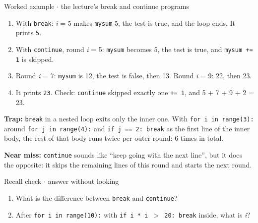 \documentclass[11pt]{article}
\begin{document}
\begin{keepsection}
\begin{workedbox}{Worked example \ensuremath{\cdot} the lecture’s break and continue programs}
\begin{enumerate}
\item With \texttt{break}: \textit{i} = 5 makes \texttt{mysum} 5, the test is true, and the loop ends. It prints \texttt{5}.
\item With \texttt{continue}, round \textit{i} = 5: \texttt{mysum} becomes 5, the test is true, and \texttt{mysum += 1} is skipped.
\item Round \textit{i} = 7: \texttt{mysum} is 12, the test is false, then 13. Round \textit{i} = 9: 22, then 23.
\item It prints \texttt{23}. Check: \texttt{continue} skipped exactly one \texttt{+= 1}, and 5 + 7 + 9 + 2 = 23.
\end{enumerate}
\end{workedbox}

\begin{notebox}\textbf{Trap:} \texttt{break} in a nested loop exits only the inner one. With \texttt{for i in range(3):} around \texttt{for j in range(4):} and \texttt{if j == 2: break} as the first line of the inner body, the rest of that body runs twice per outer round: 6 times in total.\end{notebox}

\begin{notebox}\textbf{Near miss:} \texttt{continue} sounds like “keep going with the next line”, but it does the opposite: it skips the remaining lines of this round and starts the next round.\end{notebox}

\begin{recallbox}{Recall check \ensuremath{\cdot} answer without looking}
\begin{enumerate}
\item What is the difference between \texttt{break} and \texttt{continue}?
\item After \texttt{for i in range(10):} with \texttt{if i * i \ensuremath{>} 20: break} inside, what is \textit{i}?
\end{enumerate}

\end{recallbox}
\end{keepsection}
\end{document}
